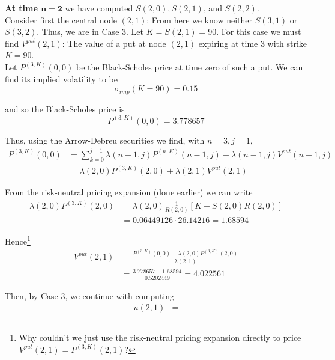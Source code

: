 \documentclass[12pt]{article}
\newlength\tindent
\renewcommand{\indent}{\hspace*{\tindent}}
\begin{document}
{\bf At time $\bm{n = 2}$} we have computed $S(2,0), S(2,1)$, and $S(2,2)$. \\

\indent Consider first the central node $(2,1)$: From here we know neither $S(3,1)$ or $S(3,2)$. Thus, we are in Case 3. Let $K = S(2,1) = 90$. For this case we must find $V^{put}(2,1)$: The value of a put at node $(2,1)$ expiring at time 3 with strike $K = 90$. \\

\indent Let $P^{(3,K)}(0,0)$ be the Black-Scholes price at time zero of such a put. We can find its implied volatility to be
\begin{equation*}
	\sigma_{imp}(K = 90) = 0.15
\end{equation*}

and so the Black-Scholes price is
\begin{equation*}
	P^{(3,K)}(0,0) = 3.778657
\end{equation*}

Thus, using the Arrow-Debreu securities we find, with $n = 3, j = 1$,
\begin{align*}
	P^{(3,K)}(0,0) &= \sum^{j - 1}_{k = 0} \lambda(n - 1,j)P^{(n,K)}(n - 1, j) + \lambda(n - 1, j) V^{put}(n - 1, j) \\
	&= \lambda(2,0)P^{(3,K)}(2,0) + \lambda(2,1)V^{put}(2,1)
\end{align*}

From the risk-neutral pricing expansion (done earlier) we can write
\begin{align*}
	\lambda(2,0)P^{(3,K)}(2,0) &= \lambda(2,0) \frac{1}{R(2,0)} \left[ K - S(2, 0)R(2,0) \right] \\
	&= 0.06449126 \cdot 26.14216 = 1.68594
\end{align*}

Hence\footnote{Why couldn't we just use the risk-neutral pricing expansion directly to price $V^{put}(2,1) = P^{(3,K)}(2,1)$?}
\begin{align*}
	V^{put}(2,1) &= \frac{ P^{(3,K)}(0,0) - \lambda(2,0)P^{(3,K)}(2,0) }{ \lambda(2,1)} \\
	&= \frac{ 3.778657 - 1.68594 }{ 0.5202449 } = 4.022561
\end{align*}

Then, by Case 3, we continue with computing
\begin{align*}
	u(2,1) &= 
\end{align*}
\end{document}
